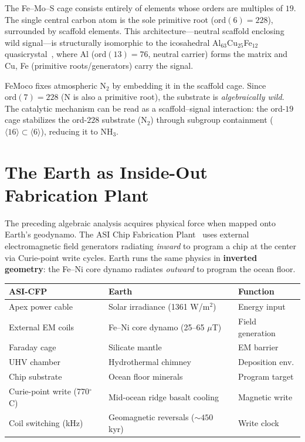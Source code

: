 \documentclass[12pt]{article}
\theoremstyle{principia}
\theoremstyle{definition}
\theoremstyle{remark}
\begin{document}
\noindent The Fe--Mo--S cage consists entirely of elements whose orders are multiples of $19$. The single central carbon atom is the sole primitive root ($\mathrm{ord}(6) = 228$), surrounded by scaffold elements. This architecture---neutral scaffold enclosing wild signal---is structurally isomorphic to the icosahedral Al$_{63}$Cu$_{25}$Fe$_{12}$ quasicrystal~\cite{Shechtman84, TsaiGuo00}, where Al ($\mathrm{ord}(13) = 76$, neutral carrier) forms the matrix and Cu, Fe (primitive roots/generators) carry the signal.

FeMoco fixes atmospheric N$_2$ by embedding it in the scaffold cage. Since $\mathrm{ord}(7) = 228$ (N is also a primitive root), the substrate is \emph{algebraically wild}. The catalytic mechanism can be read as a scaffold--signal interaction: the ord-$19$ cage stabilizes the ord-$228$ substrate (N$_2$) through subgroup containment ($\langle 16 \rangle \subset \langle 6 \rangle$), reducing it to NH$_3$.

\section{The Earth as Inside-Out Fabrication Plant}\label{sec:earth}

The preceding algebraic analysis acquires physical force when mapped onto Earth's geodynamo. The ASI Chip Fabrication Plant~\cite{LaRue_PP} uses external electromagnetic field generators radiating \emph{inward} to program a chip at the center via Curie-point write cycles. Earth runs the same physics in \textbf{inverted geometry}: the Fe--Ni core dynamo radiates \emph{outward} to program the ocean floor.

\begin{center}
\begin{tabular}{@{}p{4cm}p{5cm}p{3.5cm}@{}}
\toprule
\textbf{ASI-CFP} & \textbf{Earth} & \textbf{Function} \\
\midrule
Apex power cable & Solar irradiance (1361 W/m$^2$) & Energy input \\
External EM coils & Fe--Ni core dynamo (25--65 $\mu$T) & Field generation \\
Faraday cage & Silicate mantle & EM barrier \\
UHV chamber & Hydrothermal chimney & Deposition env. \\
Chip substrate & Ocean floor minerals & Program target \\
Curie-point write (770$^\circ$C) & Mid-ocean ridge basalt cooling & Magnetic write \\
Coil switching (kHz) & Geomagnetic reversals (${\sim}450$ kyr) & Write clock \\
\bottomrule
\end{tabular}
\end{center}
\end{document}
